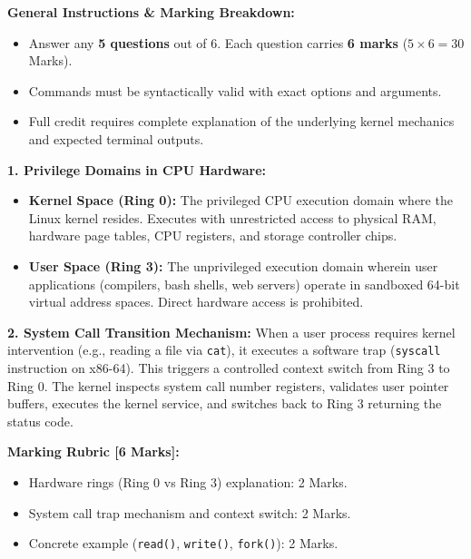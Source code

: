 
\begin{markingrubric}
\textbf{General Instructions \& Marking Breakdown:}
\begin{itemize}[leftmargin=1.5em, itemsep=1pt]
    \item Answer any \textbf{5 questions} out of 6. Each question carries \textbf{6 marks} ($5 \times 6 = 30$ Marks).
    \item Commands must be syntactically valid with exact options and arguments.
    \item Full credit requires complete explanation of the underlying kernel mechanics and expected terminal outputs.
\end{itemize}
\end{markingrubric}


\begin{examsol}
\textbf{1. Privilege Domains in CPU Hardware:}
\begin{itemize}[leftmargin=1.5em]
    \item \textbf{Kernel Space (Ring 0):} The privileged CPU execution domain where the Linux kernel resides. Executes with unrestricted access to physical RAM, hardware page tables, CPU registers, and storage controller chips.
    \item \textbf{User Space (Ring 3):} The unprivileged execution domain wherein user applications (compilers, bash shells, web servers) operate in sandboxed 64-bit virtual address spaces. Direct hardware access is prohibited.
\end{itemize}

\textbf{2. System Call Transition Mechanism:}
When a user process requires kernel intervention (e.g., reading a file via \texttt{cat}), it executes a software trap (\texttt{syscall} instruction on x86-64). This triggers a controlled context switch from Ring 3 to Ring 0. The kernel inspects system call number registers, validates user pointer buffers, executes the kernel service, and switches back to Ring 3 returning the status code.

\begin{markingrubric}
\textbf{Marking Rubric [6 Marks]:}
\begin{itemize}[leftmargin=1.5em]
    \item Hardware rings (Ring 0 vs Ring 3) explanation: 2 Marks.
    \item System call trap mechanism and context switch: 2 Marks.
    \item Concrete example (\texttt{read()}, \texttt{write()}, \texttt{fork()}): 2 Marks.
\end{itemize}
\end{markingrubric}
\end{examsol}

